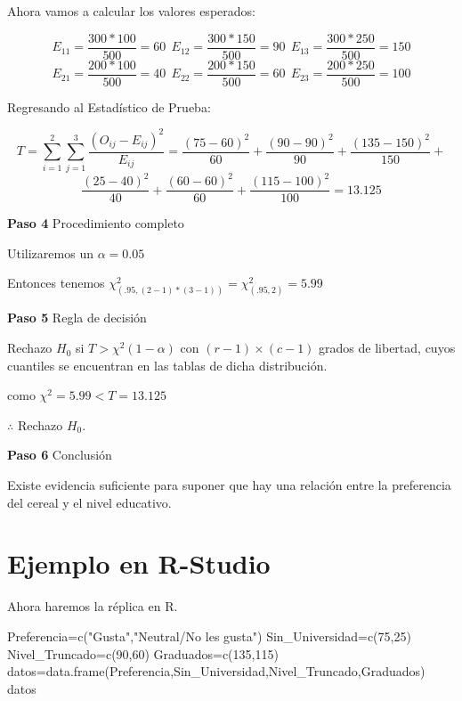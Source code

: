 \documentclass[
  a4paper,
  oneside,
  openany]{book}
\newenvironment{Shaded}{\begin{snugshade}}{\end{snugshade}}
\newcommand{\DecValTok}[1]{\textcolor[rgb]{0.00,0.00,0.81}{#1}}
\newcommand{\FunctionTok}[1]{\textcolor[rgb]{0.00,0.00,0.00}{#1}}
\newcommand{\NormalTok}[1]{#1}
\newcommand{\OtherTok}[1]{\textcolor[rgb]{0.56,0.35,0.01}{#1}}
\newcommand{\StringTok}[1]{\textcolor[rgb]{0.31,0.60,0.02}{#1}}
\begin{document}
Ahora vamos a calcular los valores esperados:

\[E_{11}=\frac{300*100}{500}=60 \ \ E_{12}=\frac{300*150}{500}=90 \ \  E_{13}=\frac{300*250}{500}=150\]
\[E_{21}=\frac{200*100}{500}=40 \ \  E_{22}=\frac{200*150}{500}=60 \ \ E_{23}=\frac{200*250}{500}=100\]

Regresando al Estadístico de Prueba:

\[T=\sum_{i=1}^{2}\sum_{j=1}^{3}\frac{(O_{ij}-E_{ij})^2}{E_{ij}}= \frac{(75-60)^2}{60}+\frac{(90-90)^2}{90}+\frac{(135-150)^2}{150}+\]
\[\frac{(25-40)^2}{40}+\frac{(60-60)^2}{60}+\frac{(115-100)^2}{100}=13.125\]

\textbf{Paso 4} Procedimiento completo

Utilizaremos un \(\alpha=0.05\)

Entonces tenemos \(\chi^2_{(.95,(2-1)*(3-1))}=\chi^2_{(.95,2)}=5.99\)

\textbf{Paso 5} Regla de decisión

Rechazo \(H_0\) si \(T> \chi^2(1-\alpha)\) con \((r-1)\times(c-1)\) grados de libertad, cuyos cuantiles se encuentran en las tablas de dicha distribución.

como \(\chi^2=5.99 < T=13.125\)

\(\therefore\) Rechazo \(H_0\).

\textbf{Paso 6} Conclusión

Existe evidencia suficiente para suponer que hay una relación entre la preferencia del cereal y el nivel educativo.

\hypertarget{ejemplo-en-r-studio-10}{%
\section{Ejemplo en R-Studio}\label{ejemplo-en-r-studio-10}}

Ahora haremos la réplica en R.

\begin{Shaded}
\begin{Highlighting}[]
\NormalTok{Preferencia}\OtherTok{=}\FunctionTok{c}\NormalTok{(}\StringTok{"Gusta"}\NormalTok{,}\StringTok{"Neutral/No les gusta"}\NormalTok{)}
\NormalTok{Sin\_Universidad}\OtherTok{=}\FunctionTok{c}\NormalTok{(}\DecValTok{75}\NormalTok{,}\DecValTok{25}\NormalTok{)}
\NormalTok{Nivel\_Truncado}\OtherTok{=}\FunctionTok{c}\NormalTok{(}\DecValTok{90}\NormalTok{,}\DecValTok{60}\NormalTok{)}
\NormalTok{Graduados}\OtherTok{=}\FunctionTok{c}\NormalTok{(}\DecValTok{135}\NormalTok{,}\DecValTok{115}\NormalTok{)}
\NormalTok{datos}\OtherTok{=}\FunctionTok{data.frame}\NormalTok{(Preferencia,Sin\_Universidad,Nivel\_Truncado,Graduados)}
\NormalTok{datos}
\end{Highlighting}
\end{Shaded}
\end{document}

